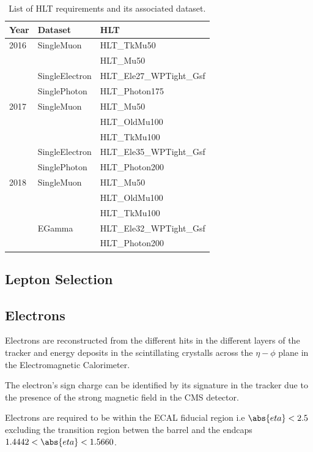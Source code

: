 \begin{table}[h]
\centering
\caption{List of HLT requirements and its associated dataset.}
\begin{tabular}{|l|l|l|}
\hline
Year & Dataset & HLT                \\ \hline
2016 & SingleMuon     & HLT\_TkMu50 \\
     &                & HLT\_Mu50   \\
     & SingleElectron & HLT\_Ele27\_WPTight\_Gsf  \\
     & SinglePhoton   & HLT\_Photon175            \\ \hline
2017 & SingleMuon     & HLT\_Mu50       \\
     &                & HLT\_OldMu100   \\
     &                & HLT\_TkMu100    \\
     & SingleElectron & HLT\_Ele35\_WPTight\_Gsf  \\
     & SinglePhoton   & HLT\_Photon200            \\ \hline
2018 & SingleMuon & HLT\_Mu50     \\
     &            & HLT\_OldMu100 \\
     &            & HLT\_TkMu100  \\ \hline
     & EGamma     & HLT\_Ele32\_WPTight\_Gsf \\
     &            & HLT\_Photon200           \\ \hline
\end{tabular}
\label{tab:Datasets}
\end{table}


\subsection{Lepton Selection}

\subsection{Electrons}

Electrons are reconstructed from the different hits in the different
layers of the tracker and energy deposits in the scintillating crystalls
across the $\eta-\phi$ plane in the Electromagnetic Calorimeter.

The electron's sign charge can be identified by its signature in the tracker
due to the presence of the strong magnetic field in the CMS detector.

Electrons are required to be within the ECAL fiducial region i.e
$\abs{eta}<2.5$ excluding the transition region betwen the barrel and
the endcaps $1.4442<\abs{eta}<1.5660$.

